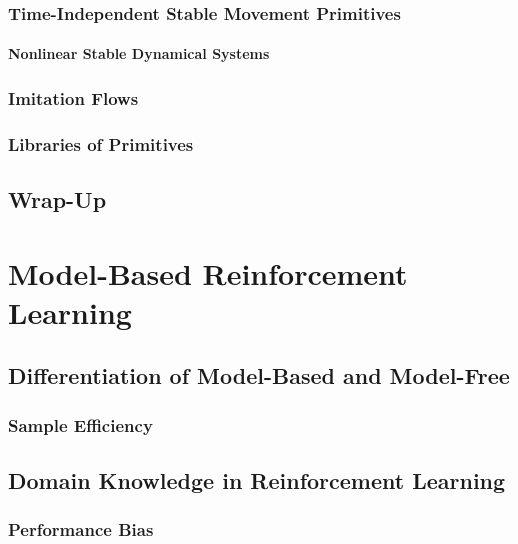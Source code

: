 		\subsection{Time-Independent Stable Movement Primitives} %

			\subsubsection{Nonlinear Stable Dynamical Systems} %

		\subsection{Imitation Flows} %

		\subsection{Libraries of Primitives} %

	\section{Wrap-Up} %

\chapter{Model-Based Reinforcement Learning} %

	\section{Differentiation of Model-Based and Model-Free} %

		\subsection{Sample Efficiency} %

	\section{Domain Knowledge in Reinforcement Learning} %

		\subsection{Performance Bias} %

